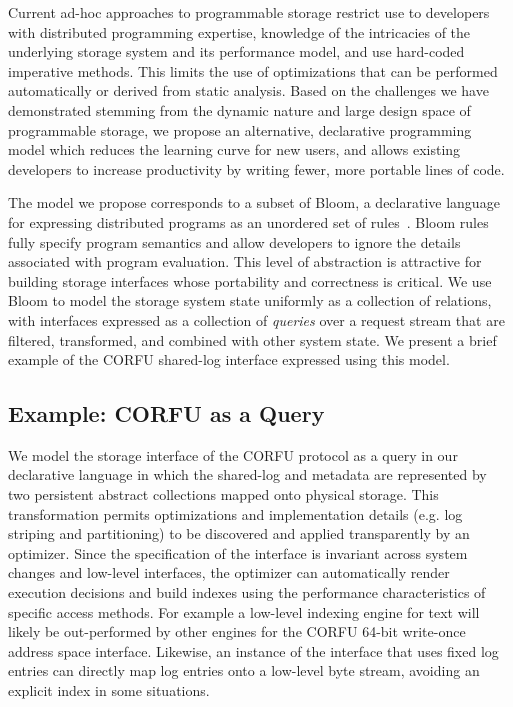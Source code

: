 Current ad-hoc approaches to programmable storage restrict
use to developers with distributed programming expertise, knowledge of the
intricacies of the underlying storage system and its performance model, and
use hard-coded imperative methods. This limits the use of optimizations that
can be performed automatically or derived from static analysis.  Based on the
challenges we have demonstrated stemming from the dynamic nature and large
design space of programmable storage, we propose an alternative, declarative
programming model which reduces the learning curve for new users, and allows
existing developers to increase productivity by writing fewer, more portable lines of code.

The model we propose corresponds to a subset of Bloom, a
declarative language for expressing distributed programs as an unordered set
of rules~\cite{alvaro:cidr11}. Bloom rules fully specify program semantics and
allow developers to ignore the details associated with program
evaluation. This level of abstraction is attractive for building storage
interfaces whose portability and correctness is critical. We use Bloom to model the
storage system state uniformly as a collection of relations, with interfaces
expressed as a collection of \emph{queries} over a request stream that
are filtered, transformed, and combined with other system state. We present a
brief example of the CORFU shared-log interface expressed using this model.

\subsection{Example: CORFU as a Query}

We model the storage interface of the CORFU protocol as a query in our
declarative language in which the shared-log and metadata are represented by
two persistent abstract collections mapped onto physical storage. This
transformation permits optimizations and implementation details (e.g. log
striping and partitioning) to be discovered and applied transparently by an
optimizer.  Since the specification of the interface is invariant across
system changes and low-level interfaces, the optimizer can automatically
render execution decisions and build indexes using the performance
characteristics of specific access methods.  For example a low-level indexing
engine for text will likely be out-performed by other engines for the CORFU
64-bit write-once address space interface.  Likewise, an instance of the
interface that uses fixed log entries can directly map log entries onto a
low-level byte stream, avoiding an explicit index in some situations.

